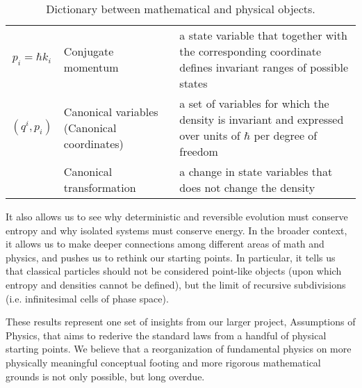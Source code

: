 \documentclass[11pt]{article}
\begin{document}
\begin{table}[h]
\begin{tabular}{c p{} p{} }
		$p_i=\hbar k_i$ & Conjugate momentum & a state variable that together with the corresponding coordinate defines invariant ranges of possible states \\
		$(q^i, p_i)$ & Canonical variables \newline (Canonical coordinates) & a set of variables for which the density is invariant and expressed over units of $\hbar$ per degree of freedom\\ 
		& Canonical transformation & a change in state variables that does not change the density\\ 
	\end{tabular}
	\caption{Dictionary between mathematical and physical objects.}
	\label{dictionary}
\end{table}
It also allows us to see why deterministic and reversible evolution must conserve entropy and why isolated systems must conserve energy. In the broader context, it allows us to make deeper connections among different areas of math and physics, and pushes us to rethink our starting points. In particular, it tells us that classical particles should not be considered point-like objects (upon which entropy and densities cannot be defined), but the limit of recursive subdivisions (i.e. infinitesimal cells of phase space).

These results represent one set of insights from our larger project, Assumptions of Physics, that aims to rederive the standard laws from a handful of physical starting points. We believe that a reorganization of fundamental physics on more physically meaningful conceptual footing and more rigorous mathematical grounds is not only possible, but long overdue.



{}
\end{document}
